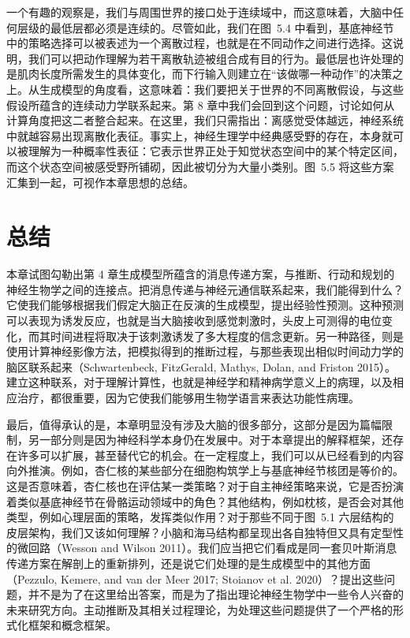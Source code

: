 一个有趣的观察是，我们与周围世界的接口处于连续域中，而这意味着，大脑中任何层级的最低层都必须是连续的。尽管如此，我们在图~5.4 中看到，基底神经节中的策略选择可以被表述为一个离散过程，也就是在不同动作之间进行选择。这说明，我们可以把动作理解为若干离散轨迹被组合成有目的行为。最低层也许处理的是肌肉长度所需发生的具体变化，而下行输入则建立在“该做哪一种动作”的决策之上。从生成模型的角度看，这意味着：我们要把关于世界的不同离散假设，与这些假设所蕴含的连续动力学联系起来。第 8 章中我们会回到这个问题，讨论如何从计算角度把这二者整合起来。在这里，我们只需指出：离感觉受体越远，神经系统中就越容易出现离散化表征。事实上，神经生理学中经典感受野的存在，本身就可以被理解为一种概率性表征：它表示世界正处于知觉状态空间中的某个特定区间，而这个状态空间被感受野所铺砌，因此被切分为大量小类别。图~5.5 将这些方案汇集到一起，可视作本章思想的总结。

\section{总结}

本章试图勾勒出第 4 章生成模型所蕴含的消息传递方案，与推断、行动和规划的神经生物学之间的连接点。把消息传递与神经元通信联系起来，我们能得到什么？它使我们能够根据我们假定大脑正在反演的生成模型，提出经验性预测。这种预测可以表现为诱发反应，也就是当大脑接收到感觉刺激时，头皮上可测得的电位变化，而其时间进程将取决于该刺激诱发了多大程度的信念更新。另一种路径，则是使用计算神经影像方法，把模拟得到的推断过程，与那些表现出相似时间动力学的脑区联系起来（Schwartenbeck, FitzGerald, Mathys, Dolan, and Friston 2015）。建立这种联系，对于理解计算性，也就是神经学和精神病学意义上的病理，以及相应治疗，都很重要，因为它使我们能够用生物学语言来表达功能性病理。

最后，值得承认的是，本章明显没有涉及大脑的很多部分，这部分是因为篇幅限制，另一部分则是因为神经科学本身仍在发展中。对于本章提出的解释框架，还存在许多可以扩展，甚至替代它的机会。在一定程度上，我们可以从已经看到的内容向外推演。例如，杏仁核的某些部分在细胞构筑学上与基底神经节核团是等价的。这是否意味着，杏仁核也在评估某一类策略？对于自主神经策略来说，它是否扮演着类似基底神经节在骨骼运动领域中的角色？其他结构，例如枕核，是否会对其他类型，例如心理层面的策略，发挥类似作用？对于那些不同于图~5.1 六层结构的皮层架构，我们又该如何理解？小脑和海马结构都呈现出各自独特但又具有定型性的微回路（Wesson and Wilson 2011）。我们应当把它们看成是同一套贝叶斯消息传递方案在解剖上的重新排列，还是说它们处理的是生成模型中的其他方面（Pezzulo, Kemere, and van der Meer 2017; Stoianov et al. 2020）？提出这些问题，并不是为了在这里给出答案，而是为了指出理论神经生物学中一些令人兴奋的未来研究方向。主动推断及其相关过程理论，为处理这些问题提供了一个严格的形式化框架和概念框架。
